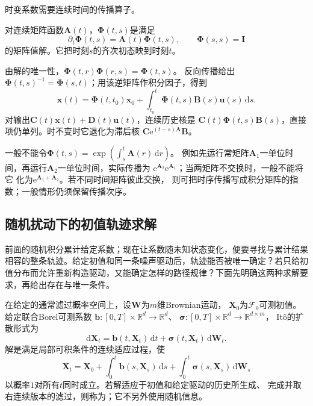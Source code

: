 时变系数需要连续时间的传播算子。
\begin{definition}[状态转移矩阵]
  \label{def:dynamical-state-transition-matrix}
  对连续矩阵函数$\bm A(t)$，$\bm\Phi(t,s)$是满足
  \begin{equation}
    \partial_t\bm\Phi(t,s)=\bm A(t)\bm\Phi(t,s),\qquad
    \bm\Phi(s,s)=\bm I
    \label{eq:dynamical-state-transition-matrix}
  \end{equation}
  的矩阵值解。它把时刻$s$的齐次初态映到时刻$t$。
\end{definition}
由解的唯一性，$\bm\Phi(t,r)\bm\Phi(r,s)=\bm\Phi(t,s)$。
反向传播给出$\bm\Phi(t,s)^{-1}=\bm\Phi(s,t)$；用该逆矩阵作积分因子，得到
\begin{equation}
  \bm x(t)=\bm\Phi(t,t_0)\bm x_0+
    \int_{t_0}^t\bm\Phi(t,s)\bm B(s)\bm u(s)\,\mathrm ds.
  \label{eq:dynamical-ltv-variation-constants}
\end{equation}
对输出$\bm C(t)\bm x(t)+\bm D(t)\bm u(t)$，连续历史核是
$\bm C(t)\bm\Phi(t,s)\bm B(s)$，直接项仍单列。时不变时它退化为滞后核
$\bm C\mathrm e^{(t-s)\bm A}\bm B$。

一般不能令$\bm\Phi(t,s)=\exp(\int_s^t\bm A(r)\,\mathrm dr)$。
例如先运行常矩阵$\bm A_1$一单位时间，再运行$\bm A_2$一单位时间，实际传播为
$\mathrm e^{\bm A_2}\mathrm e^{\bm A_1}$；当两矩阵不交换时，一般不能将它
化为$\mathrm e^{\bm A_1+\bm A_2}$。若不同时间矩阵彼此交换，
则可把时序传播写成积分矩阵的指数；一般情形仍须保留传播次序。

\subsection{随机扰动下的初值轨迹求解}
\label{sec:action-state-random-trajectory-solve}
前面的随机积分累计给定系数；现在让系数随未知状态变化，便要寻找与累计结果相容的整条轨迹。给定初值和同一条噪声驱动后，轨迹能否被唯一确定？若只给初值分布而允许重新构造驱动，又能确定怎样的路径规律？下面先明确这两种求解要求，再给出存在与唯一条件。

\begin{definition}[Itô随机微分方程与强解]
  \label{def:dynamical-ito-sde-strong-solution}
  在给定的通常滤过概率空间上，设$\bm W$为$m$维Brownian运动，
  $\bm X_0$为$\mathcal F_0$可测初值。给定联合Borel可测系数
  $\bm b:[0,T]\times\mathbb R^d\to\mathbb R^d$、
  $\bm\sigma:[0,T]\times\mathbb R^d\to\mathbb R^{d\times m}$，
  Itô的扩散形式为
  \begin{equation}
    \mathrm d\bm X_t=\bm b(t,\bm X_t)\,\mathrm dt
                  +\bm\sigma(t,\bm X_t)\,\mathrm d\bm W_t.
    \label{eq:dynamical-ito-sde}
  \end{equation}
  解是满足局部可积条件的连续适应过程，使
  \[
    \bm X_t=\bm X_0+\int_0^t\bm b(s,\bm X_s)\,\mathrm ds
                  +\int_0^t\bm\sigma(s,\bm X_s)\,\mathrm d\bm W_s
  \]
  以概率$1$对所有$t$同时成立。若解适应于初值和给定驱动的历史所生成、
  完成并取右连续版本的滤过，则称为；它不另外使用随机信息。
\end{definition}

